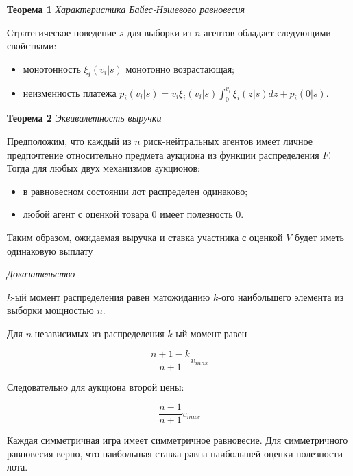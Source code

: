 
\textbf{Теорема 1} \textit{Характеристика Байес-Нэшевого равновесия}

Стратегическое поведение $s$ для выборки из $n$ агентов обладает следующими свойствами:

\begin{itemize}
    \item монотонность $\xi_i(v_i|s)$ монотонно возрастающая;
    \item неизменность платежа $p_i(v_i|s) = v_i \xi_i (v_i|s)  \int_0^{v_i} \xi_i(z|s) dz + p_i(0|s)$.
\end{itemize}


\textbf{Теорема 2} \textit{Эквивалетность выручки}

Предположим, что каждый из $n$ риск-нейтральных агентов имеет личное предпочтение относительно предмета аукциона из функции распределения $F$. Тогда для любых двух механизмов аукционов:

\begin{itemize}
    \item в равновесном состоянии лот распределен одинаково;
    \item любой агент с оценкой товара 0 имеет полезность 0.
\end{itemize}
Таким образом, ожидаемая выручка и ставка участника с оценкой $V$ будет иметь одинаковую выплату

\textit{Доказательство}

$k$-ый момент распределения равен матожиданию $k$-ого наибольшего  элемента из  выборки мощностью $n$. 

Для $n$ независимых из распределения $k$-ый момент равен

$$
    \frac{n+1-k}{n+1} v_{max}
$$

Следовательно для аукциона второй цены:

$$
    \frac{n-1}{n+1} v_{max}
$$

Каждая симметричная игра имеет симметричное равновесие.  Для симметричного равновесия верно, что наибольшая ставка равна наибольшей оценки полезности лота.